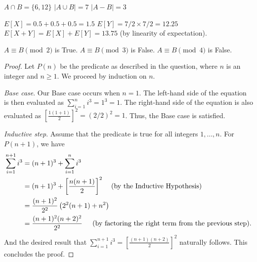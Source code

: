 \documentclass[12pt,twoside]{article}
\begin{document}

\begin{problems}

\problem  %

\begin{problemparts}
\problempart %
\(A \cap B = \{6, 12\}\)
\problempart %
\(|A \cup B| = 7\)
\problempart %
\(|A-B| = 3\)
\end{problemparts}

\problem  %

\begin{problemparts}
\problempart %
\(E[X]=0.5+0.5+0.5=1.5\)
\problempart %
\(E[Y]=7/2 \times 7/2=12.25\)
\problempart %
\(E[X+Y]=E[X]+E[Y]=13.75\) (by linearity of expectation).
\end{problemparts}

\problem  %

\begin{problemparts}
\problempart %
\(A \equiv B \pmod 2\) is True.
\problempart %
\(A \equiv B \pmod 3\) is False.
\problempart %
\(A \equiv B \pmod 4\) is False.
\end{problemparts}

\problem  %
\begin{proof}
Let \(P(n)\) be the predicate as described in the question, where \(n\) is an integer and \(n \geq 1\). We proceed by induction on \(n\).

\textit{Base case}. Our Base case occurs when \(n=1\). The left-hand side of the equation is then evaluated as \(\sum_{i=1}^n i^3 = 1^3 = 1\). The right-hand side of the equation is also evaluated as \(\left[ \frac{1(1+1)}{2} \right]^2 = (2/2)^2 = 1\). Thus, the Base case is satisfied.

\textit{Inductive step}. Assume that the predicate is true for all integers \(1,\ldots,n\). For \(P(n+1)\), we have
\begin{align*}
    \begin{split}
        \sum_{i=1}^{n+1}i^3 &= (n+1)^3 + \sum_{i=1}^n i^3 \\
                &= (n+1)^3 + \left[ \frac{n(n+1)}{2} \right]^2 \text{\;\;\;\;(by the Inductive Hypothesis)} \\
                &= \frac{(n+1)^2}{2^2} \left( 2^2(n+1)+n^2 \right) \\
                &= \frac{(n+1)^2(n+2)^2}{2^2} \text{\;\;\;\; (by factoring the right term from the previous step).}
    \end{split}
\end{align*}
And the desired result that \(\sum_{i=1}^{n+1}i^3 = \left[ \frac{(n+1)(n+2)}{2} \right]^2\) naturally follows. This concludes the proof.
\end{proof}


\end{problems}
\end{document}
